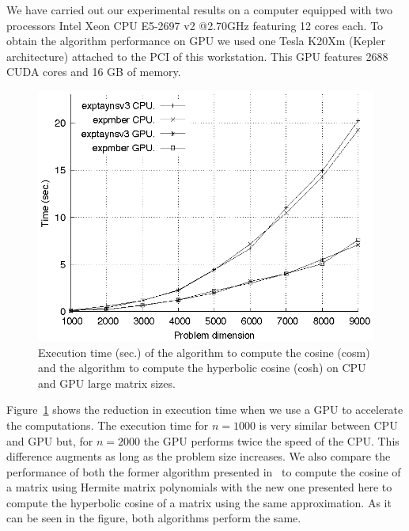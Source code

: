 We have carried out our experimental results on a computer equipped with two processors Intel Xeon CPU E5-2697 v2 @2.70GHz featuring 12 cores each.
To obtain the algorithm performance on GPU we used one \nvidia Tesla K20Xm (Kepler architecture) attached to the PCI of this workstation.
This GPU features 2688 CUDA cores and 16 GB of memory.

\begin{figure}[!t]
        \setlength{\tabcolsep}{-10pt}
        \begin{center}
                \includegraphics[scale=0.9]{Figures/Tiempoparalelo.eps}
        \end{center}
        \caption{\label{fig:results_gpu} Execution time (sec.) of the algorithm to compute the cosine (cosm) and the algorithm to compute the hyperbolic cosine (cosh) on CPU and GPU large matrix sizes.}
\end{figure}

Figure~\ref{fig:results_gpu} shows the reduction in execution time when we use a GPU to accelerate the computations.
The execution time for $n=1000$ is very similar between CPU and GPU but, for $n=2000$ the GPU performs twice the speed of the CPU. 
This difference augments as long as the problem size increases.
We also compare the performance of both the former algorithm presented in~\cite{defez2019efficient} to compute the cosine of a matrix using
Hermite matrix polynomials with the new one presented here to compute the hyperbolic cosine of a matrix using the same approximation.
As it can be seen in the figure, both algorithms perform the same.

